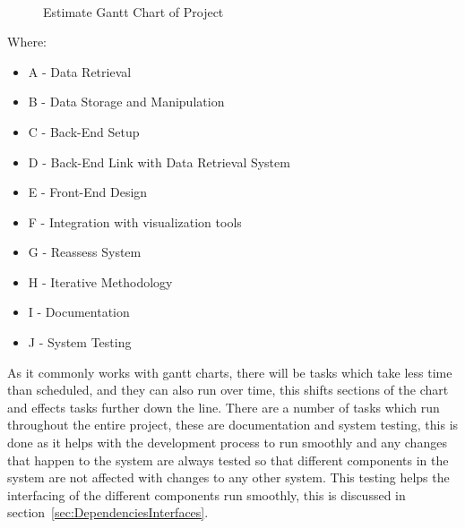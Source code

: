 \documentclass[12pt,onecolumn]{IEEEtran}
\begin{document}
\begin{center}
    \begin{figure}[htb]
        \centering
        \begin{ganttchart}{1}{30}
             \\
             \\
             \\
             \\
             \\
             \\
             \\
             \\
             \\
             \\    
             \\
        \end{ganttchart}
        \caption{Estimate Gantt Chart of Project}
        \label{fig:gantt}
    \end{figure}
\end{center}    
Where: 
\begin{itemize}
    \item A - Data Retrieval
    \item B - Data Storage and Manipulation
    \item C - Back-End Setup
    \item D - Back-End Link with Data Retrieval System
    \item E - Front-End Design
    \item F - Integration with visualization tools
    \item G - Reassess System
    \item H - Iterative Methodology
    \item I - Documentation
    \item J - System Testing
\end{itemize}

As it commonly works with gantt charts, there will be tasks which take less time than scheduled, and they can also run over time, this shifts sections of the chart and effects tasks further down the line.
There are a number of tasks which run throughout the entire project, these are documentation and system testing, this is done as it helps with the development process to run smoothly and any changes that happen to the system are always tested so that different components in the system are not affected with changes to any other system. This testing helps the interfacing of the different components run smoothly, this is discussed in section~\ref{sec:DependenciesInterfaces}.
\end{document}
